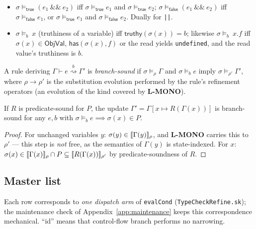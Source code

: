 \documentclass[11pt]{article}
\newcommand{\ObjVal}{\mathsf{ObjVal}}
\newcommand{\Env}{\Gamma}
\newcommand{\RefineB}[4]{#1 \vdash #2 \stackrel{#4}{\rightsquigarrow} #3}
\begin{document}
\begin{definition}
\begin{itemize}
\item $\sigma \models_{\mathsf{true}} (e_1\ \texttt{\&\&}\ e_2)$ iff
  $\sigma \models_{\mathsf{true}} e_1$ and
  $\sigma \models_{\mathsf{true}} e_2$;\;
  $\sigma \models_{\mathsf{false}} (e_1\ \texttt{\&\&}\ e_2)$ iff
  $\sigma \models_{\mathsf{false}} e_1$, or
  $\sigma \models_{\mathsf{true}} e_1$ and
  $\sigma \models_{\mathsf{false}} e_2$. Dually for \texttt{||}.
\item $\sigma \models_b\ x$ (truthiness of a variable) iff
  $\mathsf{truthy}(\sigma(x)) = b$; likewise
  $\sigma \models_b\ x.f$ iff $\sigma(x) \in \ObjVal$,
  $\mathsf{has}(\sigma(x), f)$ or the read yields \texttt{undefined}, and
  the read value's truthiness is $b$.
\end{itemize}
\end{definition}

\begin{definition}
\label{def:branch-sound}
A rule deriving $\RefineB{\Env}{e}{\Env'}{b}$ is \emph{branch-sound} if
$\sigma \models_\rho \Env$ and $\sigma \models_b e$ imply
$\sigma \models_{\rho'} \Env'$, where $\rho \to \rho'$ is the substitution
evolution performed by the rule's refinement operators (an evolution of the
kind covered by \textbf{L-MONO}).
\end{definition}

\begin{lemma}
\label{lem:pred-to-branch}
If $R$ is predicate-sound for $P$, the update
$\Env' = \Env[x \mapsto R(\Env(x))]$ is branch-sound for any $e, b$ with
$\sigma \models_b e \implies \sigma(x) \in P$.
\end{lemma}
\begin{proof}
For unchanged variables $y$: $\sigma(y) \in \sem{\Env(y)}_\rho$, and
\textbf{L-MONO} carries this to $\rho'$ — this step is \emph{not} free, as
the semantics of $\Env(y)$ is state-indexed. For $x$:
$\sigma(x) \in \sem{\Env(x)}_\rho \cap P \subseteq \sem{R(\Env(x))}_{\rho'}$
by predicate-soundness of $R$.
\end{proof}

\subsection{Master list}
\label{sec:master-list}

Each row corresponds to \emph{one dispatch arm} of \texttt{evalCond}
(\texttt{TypeCheckRefine.sk}); the maintenance check of
Appendix~\ref{app:maintenance} keeps this correspondence mechanical. ``id''
means that control-flow branch performs no narrowing.
\end{document}
